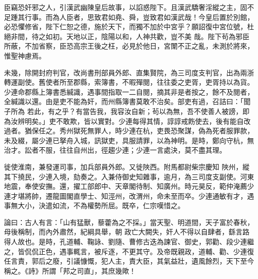 \begin{pinyinscope}
 臣竊恐奸邪之人，引漢武幽陳皇后故事，以諂惑陛下。且漢武驕奢淫縱之主，固不足踵其行事。而為人臣者，思致君如堯、舜，豈致君如漢武哉！今皇后置於別館，必恐懼修省，陛下仁恕之德，施於天下，而獨不加於中宮乎？願詔復中宮位號，杜絕非間，待之如初。天地以正，陰陽以和，人神共歡，豈不美
 哉。陛下茍為邪臣所蔽，不加省察，臣恐高宗王後之枉，必見於他日，宮闈不正之亂，未測於將來，惟聖神慮焉。



 未幾，除開封府判官，改尚書刑部員外郎、直集賢院，為三司度支判官，出為兩浙轉運副使。舊使者所至郡縣，索簿書，不暇殫閱，往往委之吏胥，吏胥持以為貨。少連命郡縣上簿書悉緘識，遇事間指取一二自閱，摘其非是者按之，餘不及閱者，全緘識以還。由是吏不能為奸，而州縣簿書莫敢不治矣。部吏有過，召詰曰：「聞子所為
 若此，有之乎？有當告我，我容汝自新；茍以為無，吾不使善人被謗，即為汝辨明矣。」吏不敢欺，皆以實對。少連每得其情，諄諄戒飭使去，後有能自改過者。猶保任之。秀州獄死無罪人，時少連在杭，吏畏恐聚謀，偽為死者服罪款，未及綴，屬少連已拏舟入城，訊獄吏，具服請罪，以為神明。是時，鄭向守杭，無治才。訟者不服，往往自州出，徑趨少連；少連一言處決，莫不盡其理。



 徙使淮南，兼發運司事，加兵部員外郎。又徙陜西。附馬都尉柴宗慶知
 陜州，縱其下撓民，少連入境，劾奏之。入兼侍御史知雜事，逾月，為三司度支副使。河東地震，奉使安撫。還，擢工部郎中、天章閣待制、知廣州。時元昊反，範仲淹薦少連才堪將帥，遷龍圖閣直學士、知涇州，改渭州，命未至而卒。少連通敏有才，遇事無大小，決遣如流，不為權勢所屈。既卒，仁宗嘆惜之。



 論曰：古人有言：「山有猛獸，藜藿為之不採。」當天聖、明道間，天子富於春秋，母後稱制，而內外肅然，紀綱具舉，朝
 政亡大闕失，奸人不得以自肆者，繇言路得人故也。是時，孔道輔、鞠詠、劉隨、曹修古迭為諫官、御史，郭勸、段少連繼之，皆侃侃正色，遇事輒言，被斥逐，不更其守。及帝既親政，道輔、勸、少連復任言責，郭后之廢，引議慷慨，犯人主，責大臣，其氣益壯，遺風餘烈，天下至今稱之。《詩》所謂「邦之司直」，其庶幾歟！



\end{pinyinscope}